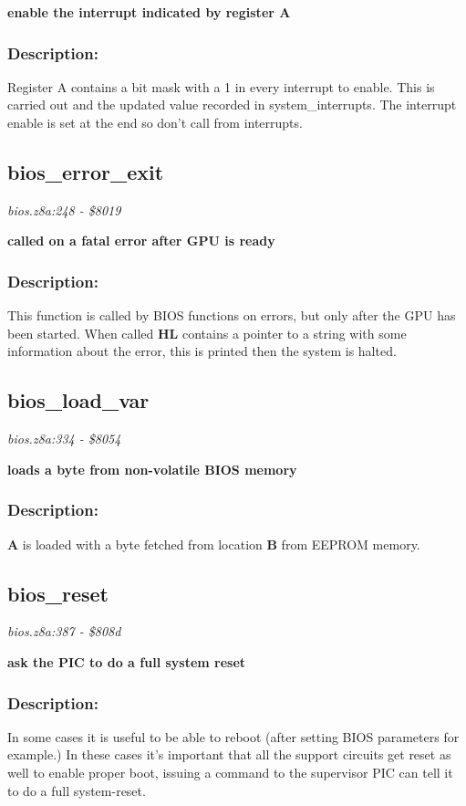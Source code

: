 \noindent
\textbf{enable the interrupt indicated by register A}

\subsubsection{Description:}
 Register A contains a bit mask with a 1 in every interrupt to enable.  This is carried out and the updated value recorded in system\_interrupts.  The interrupt enable is set at the end so don't call from interrupts.

\subsection{bios\_error\_exit}
\textit{bios.z8a:248 - \$8019}

\noindent
\textbf{called on a fatal error after GPU is ready}

\subsubsection{Description:}
 This function is called by BIOS functions on errors, but only after the GPU has been started.  When called \textbf{HL} contains a pointer to a string with some information about the error, this is printed then the system is halted.

\subsection{bios\_load\_var}
\textit{bios.z8a:334 - \$8054}

\noindent
\textbf{loads a byte from non-volatile BIOS memory}

\subsubsection{Description:}
 \textbf{A} is loaded with a byte fetched from location \textbf{B} from EEPROM memory.

\subsection{bios\_reset}
\textit{bios.z8a:387 - \$808d}

\noindent
\textbf{ask the PIC to do a full system reset}

\subsubsection{Description:}
 In some cases it is useful to be able to reboot (after setting BIOS parameters for example.)  In these cases it's important that all the support circuits get reset as well to enable proper boot, issuing a command to the supervisor PIC can tell it to do a full system-reset.

